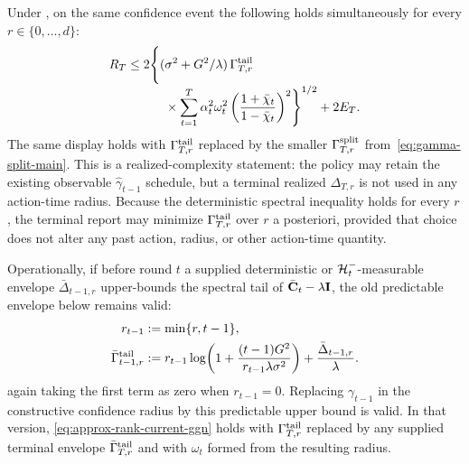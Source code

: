\begin{corollary}
\label{cor:approx-rank-current-ggn}
Under , on the same confidence event
the following holds simultaneously for every $r\in\{0,\ldots,d\}$:
\begin{equation}\label{eq:approx-rank-current-ggn}
\begin{aligned}
 R_T&\le 2\Biggl\{(\sigma^2+G^2/\lambda)\,
 \Gamma^{\rm tail}_{T,r}\\[-1mm]
 &\qquad\quad\times\sum_{t=1}^T\alpha_t^2\omega_t^2
 \left(\frac{1+\bar\chi_t}{1-\bar\chi_t}\right)^2\Biggr\}^{1/2}
 +2E_T.
\end{aligned}
\end{equation}
The same display holds with $\Gamma^{\rm tail}_{T,r}$ replaced by the
smaller $\Gamma^{\rm split}_{T,r}$ from~\eqref{eq:gamma-split-main}.
This is a realized-complexity statement: the policy may retain the existing
observable $\hat\gamma_{t-1}$ schedule, but a terminal realized
$\Delta_{T,r}$ is not used in any action-time radius.  Because the deterministic
spectral inequality holds for every $r$, the terminal report may minimize
$\Gamma^{\rm tail}_{T,r}$ over $r$ a posteriori, provided that choice does not
alter any past action, radius, or other action-time quantity.

Operationally, if before round $t$ a supplied deterministic or
$\mathcal{H}_t^-$-measurable envelope $\bar\Delta_{t-1,r}$ upper-bounds the spectral
tail of $\bar{\mathbf{C}}_t-\lambda\mathbf{I}$, the old predictable envelope below remains
valid:
\[
\begin{aligned}
 r_{t-1}&:=\min\{r,t-1\},\\
 \bar\Gamma^{\rm tail}_{t-1,r}
 &:=r_{t-1}\log\!\left(1+\frac{(t-1)G^2}
 {r_{t-1}\lambda\sigma^2}\right)
 +\frac{\bar\Delta_{t-1,r}}\lambda.
\end{aligned}
\]
again taking the first term as zero when $r_{t-1}=0$.
Replacing $\gamma_{t-1}$ in the constructive confidence radius by this
predictable upper bound is valid.  In that version,
\eqref{eq:approx-rank-current-ggn} holds with
$\Gamma^{\rm tail}_{T,r}$ replaced by any supplied terminal envelope
$\bar\Gamma^{\rm tail}_{T,r}$ and with $\omega_t$ formed from the resulting
radius.


\end{corollary}
